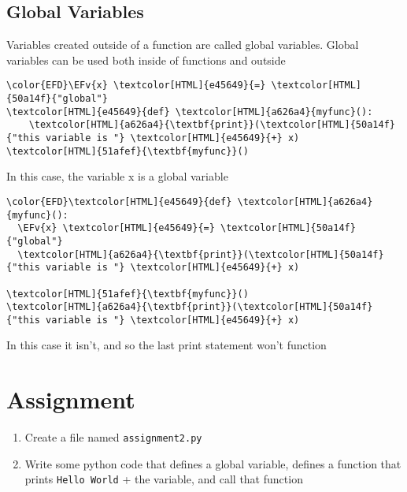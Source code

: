 \documentclass{scrartcl}
\newcommand{\EFv}[1]{\textcolor{EFv}{#1}} %
\begin{document}
\subsection{Global Variables}
\label{sec:orgf712ab1}
Variables created outside of a function are called global variables. Global
variables can be used both inside of functions and outside
\begin{Code}
\begin{Verbatim}[]
\color{EFD}\EFv{x} \textcolor[HTML]{e45649}{=} \textcolor[HTML]{50a14f}{"global"}
\textcolor[HTML]{e45649}{def} \textcolor[HTML]{a626a4}{myfunc}():
    \textcolor[HTML]{a626a4}{\textbf{print}}(\textcolor[HTML]{50a14f}{"this variable is "} \textcolor[HTML]{e45649}{+} x)
\textcolor[HTML]{51afef}{\textbf{myfunc}}()
\end{Verbatim}
\end{Code}
In this case, the variable x is a global variable
\begin{Code}
\begin{Verbatim}[]
\color{EFD}\textcolor[HTML]{e45649}{def} \textcolor[HTML]{a626a4}{myfunc}():
  \EFv{x} \textcolor[HTML]{e45649}{=} \textcolor[HTML]{50a14f}{"global"}
  \textcolor[HTML]{a626a4}{\textbf{print}}(\textcolor[HTML]{50a14f}{"this variable is "} \textcolor[HTML]{e45649}{+} x)

\textcolor[HTML]{51afef}{\textbf{myfunc}}()
\textcolor[HTML]{a626a4}{\textbf{print}}(\textcolor[HTML]{50a14f}{"this variable is "} \textcolor[HTML]{e45649}{+} x)
\end{Verbatim}
\end{Code}
In this case it isn't, and so the last print statement won't function

\section{Assignment}
\label{sec:org26386b6}
\begin{enumerate}
\item Create a file named \texttt{assignment2.py}
\item Write some python code that defines a global variable, defines a function
that prints \texttt{Hello World} + the variable, and call that function
\end{enumerate}
\end{document}
